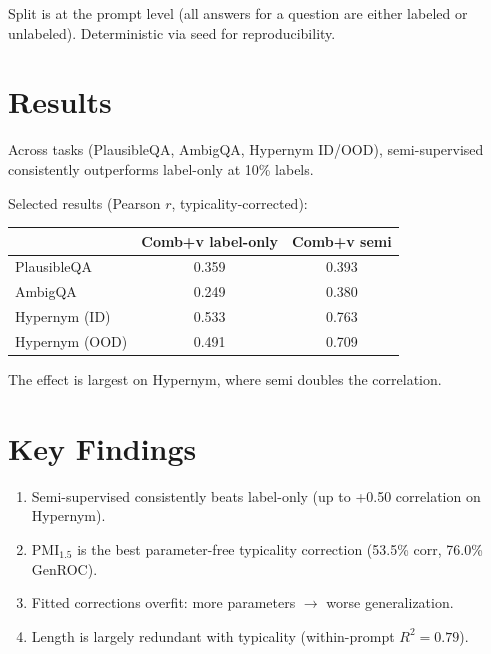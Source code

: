 \documentclass[11pt]{article}
\begin{document}
Split is at the prompt level (all answers for a question are either labeled or unlabeled). Deterministic via seed for reproducibility.



\section{Results}

Across tasks (PlausibleQA, AmbigQA, Hypernym ID/OOD), semi-supervised consistently outperforms label-only at 10\% labels.

Selected results (Pearson $r$, typicality-corrected):
\begin{center}
\begin{tabular}{lcc}
  & Comb+v label-only & Comb+v semi \\
  \hline
  PlausibleQA & 0.359 & 0.393 \\
  AmbigQA & 0.249 & 0.380 \\
  Hypernym (ID) & 0.533 & 0.763 \\
  Hypernym (OOD) & 0.491 & 0.709 \\
\end{tabular}
\end{center}

The effect is largest on Hypernym, where semi doubles the correlation.



\section{Key Findings}

\begin{enumerate}
  \item Semi-supervised consistently beats label-only (up to +0.50 correlation on Hypernym).
  \item PMI$_{1.5}$ is the best parameter-free typicality correction (53.5\% corr, 76.0\% GenROC).
  \item Fitted corrections overfit: more parameters $\to$ worse generalization.
  \item Length is largely redundant with typicality (within-prompt $R^2 = 0.79$).
\end{enumerate}
\end{document}
